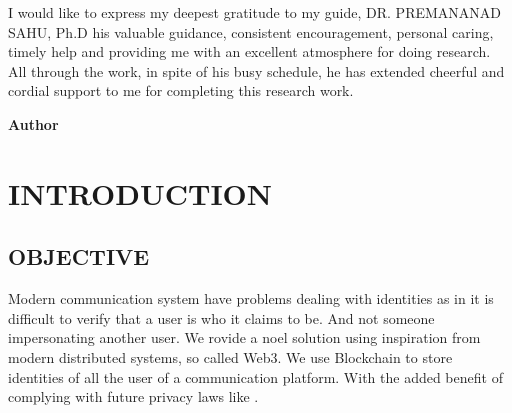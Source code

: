 \documentclass[BTech]{srmuthesis}
\begin{document}
\pagebreak
\acknowledgements
I would like to express my deepest gratitude to my guide, DR. PREMANANAD SAHU, Ph.D
his valuable guidance, consistent encouragement, personal caring, timely help and providing me with an excellent atmosphere for doing research. All through the work, in spite of his busy schedule, he has extended cheerful and cordial support to me for completing this research work.\\



\begin{flushright}
{\bf Author}
\end{flushright}

\begin{singlespace}
\tableofcontents
\thispagestyle{empty}

\end{singlespace}




\pagebreak
\clearpage



\chapter{INTRODUCTION}
\section{OBJECTIVE}
 Modern communication system have problems dealing with identities as in it is difficult to verify that a user is who it claims to be. And not someone impersonating another user. We rovide a noel solution using inspiration from modern distributed systems, so called Web3.
 We use Blockchain to store identities of all the user of a communication platform. With the added benefit of complying with future privacy laws like \citet{dsa}.
\end{document}
